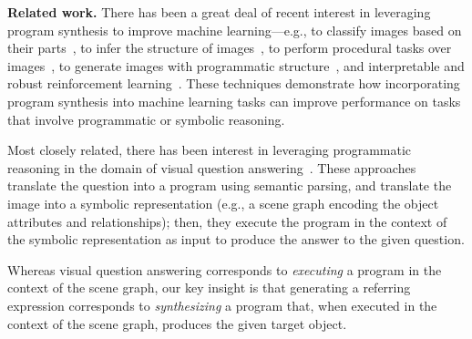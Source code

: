



\textbf{Related work.}
%
There has been a great deal of recent interest in leveraging program synthesis to improve machine learning---e.g., to classify images based on their parts~\cite{lake2015human}, to infer the structure of images~\cite{ellis2015unsupervised,ellis2018learning,pu2018selecting}, to perform procedural tasks over images~\cite{gaunt2017differentiable,valkov2018houdini}, to generate images with programmatic structure~\cite{young2019learning}, and interpretable and robust reinforcement learning~\cite{verma2018programmatically,bastani2018verifiable,verma2019imitation,jothimurugan2019composable,inala2020synthesizing}. These techniques demonstrate how incorporating program synthesis into machine learning tasks can improve performance on tasks that involve programmatic or symbolic reasoning.

Most closely related, there has been interest in leveraging programmatic reasoning in the domain of visual question answering~\cite{mao2019neuro,ma2019towards}. These approaches translate the question into a program using semantic parsing, and translate the image into a symbolic representation (e.g., a scene graph encoding the object attributes and relationships); then, they execute the program in the context of the symbolic representation as input to produce the answer to the given question.

Whereas visual question answering corresponds to \emph{executing} a program in the context of the scene graph, our key insight is that generating a referring expression corresponds to \emph{synthesizing} a program that, when executed in the context of the scene graph, produces the given target object.

